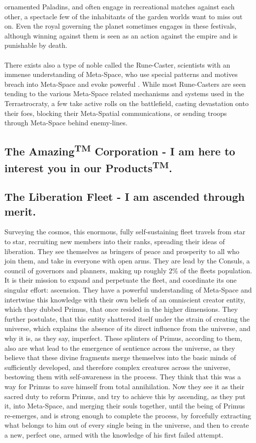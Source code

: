 \documentclass[a4paper,12pt]{report}
\begin{document}
ornamented Paladins, and often engage in recreational matches against each other, a spectacle few of the inhabitants of the garden worlds want to miss out on. Even the royal governing the planet sometimes engages in these festivals, although winning against them is seen as an action against the empire and is punishable by death.\\
\\
There exists also a type of noble called the Rune-Caster, scientists with an immense understanding of Meta-Space, who use special patterns and motives breach into Meta-Space and evoke powerful . While most Rune-Casters are seen tending to the various Meta-Space related mechanisms and systems used in the Terrastrocraty, a few take active rolls on the battlefield, casting devastation onto their foes, blocking their Meta-Spatial communications, or sending troops through Meta-Space behind enemy-lines.

\pagebreak


\subsection{The Amazing\textsuperscript{TM} Corporation - I am here to interest you in our Products\textsuperscript{TM}.}

\subsection{The Liberation Fleet - I am ascended through merit.}
Surveying the cosmos, this enormous, fully self-sustaining fleet travels from star to star, recruiting new members into their ranks, spreading their ideas of liberation. They see themselves as bringers of peace and prosperity to all who join them, and take in everyone with open arms. They are lead by the Consuls, a council of governors and planners, making up roughly 2\% of the fleets population. It is their mission to expand and perpetuate the fleet, and coordinate its one singular effort: ascension. They have a powerful understanding of Meta-Space and intertwine this knowledge with their own beliefs of an omniscient creator entity, which they dubbed Primus, that once resided in the higher dimensions. They further postulate, that this entity shattered itself under the strain of creating the universe, which explains the absence of its direct influence from the universe, and why it is, as they say, imperfect. These splinters of Primus, according to them, also are what lead to the emergence of sentience across the universe, as they believe that these divine fragments merge themselves into the basic minds of sufficiently developed, and therefore complex creatures across the universe, bestowing them with self-awareness in the process. They think that this was a way for Primus to save himself from total annihilation. Now they see it as their sacred duty to reform Primus, and try to achieve this by ascending, as they put it, into Meta-Space, and merging their souls together, until the being of Primus re-emerges, and is strong enough to complete the process, by forcefully extracting what belongs to him out of every single being in the universe, and then to create a new, perfect one, armed with the knowledge of his first failed attempt.
\end{document}
